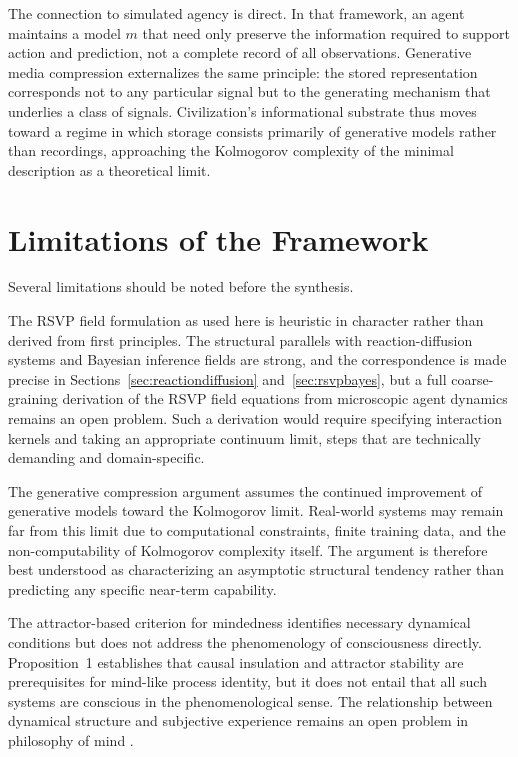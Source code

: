 \documentclass[12pt,a4paper]{article}
\theoremstyle{plain}
\theoremstyle{definition}
\begin{document}
The connection to simulated agency is direct. In that framework, an agent maintains a model $m$ that need only preserve the information required to support action and prediction, not a complete record of all observations. Generative media compression externalizes the same principle: the stored representation corresponds not to any particular signal but to the generating mechanism that underlies a class of signals. Civilization's informational substrate thus moves toward a regime in which storage consists primarily of generative models rather than recordings, approaching the Kolmogorov complexity of the minimal description as a theoretical limit.

\section{Limitations of the Framework}
\label{sec:limitations}

Several limitations should be noted before the synthesis.

The RSVP field formulation as used here is heuristic in character rather than derived from first principles. The structural parallels with reaction-diffusion systems and Bayesian inference fields are strong, and the correspondence is made precise in Sections~\ref{sec:reactiondiffusion} and~\ref{sec:rsvpbayes}, but a full coarse-graining derivation of the RSVP field equations from microscopic agent dynamics remains an open problem. Such a derivation would require specifying interaction kernels and taking an appropriate continuum limit, steps that are technically demanding and domain-specific.

The generative compression argument assumes the continued improvement of generative models toward the Kolmogorov limit. Real-world systems may remain far from this limit due to computational constraints, finite training data, and the non-computability of Kolmogorov complexity itself. The argument is therefore best understood as characterizing an asymptotic structural tendency rather than predicting any specific near-term capability.

The attractor-based criterion for mindedness identifies necessary dynamical conditions but does not address the phenomenology of consciousness directly. Proposition~1 establishes that causal insulation and attractor stability are prerequisites for mind-like process identity, but it does not entail that all such systems are conscious in the phenomenological sense. The relationship between dynamical structure and subjective experience remains an open problem in philosophy of mind \cite{Chalmers1996}.
\end{document}
